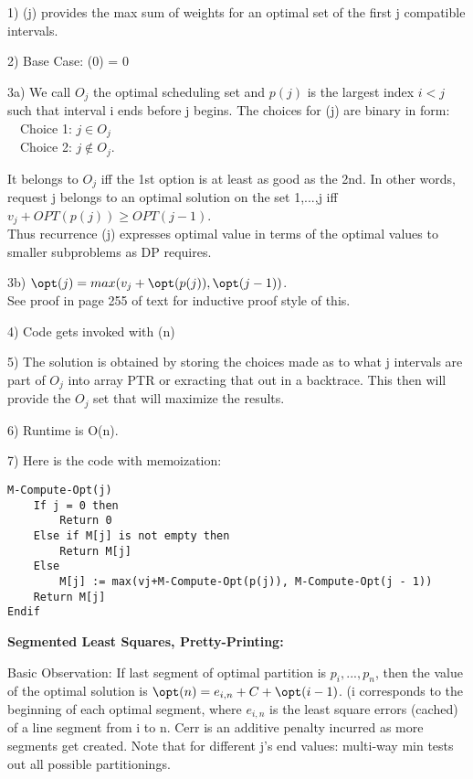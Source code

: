1) \opt(j) provides the max sum of weights for an optimal set of the first j compatible intervals. 

2) Base Case: \opt(0) = 0

3a) We call $O_j$ the optimal scheduling set and $p(j)$ is the largest index $i<j$  
such that interval i ends before j begins.  The choices for \opt(j) are binary in form:\\
\ \ Choice 1:  $j\in O_j$\\
\ \ Choice 2:  $j\notin O_j$.

It belongs to $O_j$ iff the 1st option is at least as good as the 2nd.
In other words, request j belongs to an optimal solution on the set {1,...,j} 
iff $v_j + OPT(p(j)) \geq OPT(j - 1)$.\\

Thus recurrence \opt(j) expresses optimal value in terms of the optimal 
values to smaller subproblems as DP requires.

  3b) $\opt(j) = max(v_j + \opt(p(j)), \opt(j - 1))$.\\
See proof in page 255 of text for inductive proof style of this.
  
  4) Code gets invoked with \opt(n)

  5) The solution is obtained by storing the choices made as to what
j intervals are part of $O_j$ into array PTR or exracting that out
in a backtrace.  This then will provide the $O_j$ set that will maximize
the results.

  6) Runtime is O(n).

  7) Here is the code with memoization:

\begin{lstlisting}[label=lst2,mathescape,frame=single,numbers=right]
M-Compute-Opt(j)
    If j = 0 then
        Return 0
    Else if M[j] is not empty then
        Return M[j]
    Else
        M[j] := max(vj+M-Compute-Opt(p(j)), M-Compute-Opt(j - 1))
    Return M[j]
Endif
\end{lstlisting}

{\bf Segmented Least Squares, Pretty-Printing:} 

Basic Observation: If last segment of optimal partition is $p_i,...,p_n$, then the value
of the optimal solution is $\opt(n) = e_{i,n} + C + \opt(i- 1)$. (i corresponds to the beginning
of each optimal segment, where $e_{i,n}$ is the least square errors (cached) of a line segment 
from i to n.   Cerr is an additive penalty incurred as more segments get created.
Note that for different j's end values: multi-way min tests out all possible partitionings. 

